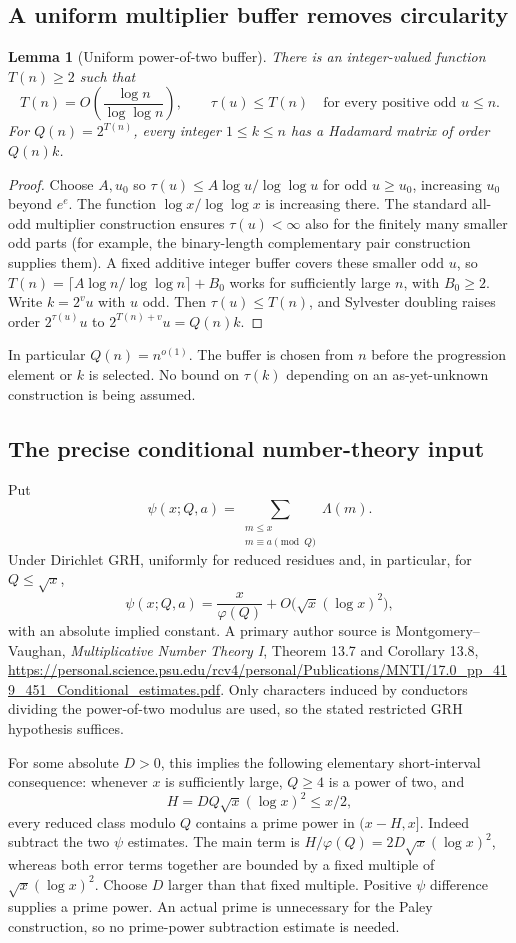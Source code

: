 \documentclass[11pt]{article}
\newtheorem{lemma}[theorem]{Lemma}
\begin{document}
\subsection{A uniform multiplier buffer removes circularity}
\begin{lemma}[Uniform power-of-two buffer]
There is an integer-valued function $T(n)\ge2$ such that
\[
 T(n)=O\!\left(\frac{\log n}{\log\log n}\right),
 \qquad \tau(u)\le T(n)\quad
 \text{for every positive odd }u\le n.
\]
For $Q(n)=2^{T(n)}$, every integer $1\le k\le n$ has a Hadamard
matrix of order $Q(n)k$.
\end{lemma}
\begin{proof}
Choose $A,u_0$ so $\tau(u)\le A\log u/\log\log u$ for odd
$u\ge u_0$, increasing $u_0$ beyond $e^e$. The function
$\log x/\log\log x$ is increasing there. The standard all-odd
multiplier construction ensures $\tau(u)<\infty$ also for the finitely
many smaller odd parts (for example, the binary-length complementary
pair construction supplies them). A fixed additive integer buffer
covers these smaller odd $u$, so
$T(n)=\lceil A\log n/\log\log n\rceil+B_0$ works for sufficiently
large $n$, with $B_0\ge2$. Write $k=2^vu$ with $u$ odd. Then
$\tau(u)\le T(n)$, and Sylvester doubling raises order
$2^{\tau(u)}u$ to $2^{T(n)+v}u=Q(n)k$.
\end{proof}

In particular $Q(n)=n^{o(1)}$. The buffer is chosen from $n$ before
the progression element or $k$ is selected. No bound on $\tau(k)$
depending on an as-yet-unknown construction is being assumed.

\subsection{The precise conditional number-theory input}
Put
\[
 \psi(x;Q,a)=\sum_{\substack{m\le x\\m\equiv a\pmod Q}}\Lambda(m).
\]
Under Dirichlet GRH, uniformly for reduced residues and, in particular,
for $Q\le\sqrt x$,
\[
 \psi(x;Q,a)=\frac{x}{\varphi(Q)}+
 O\bigl(\sqrt x(\log x)^2\bigr),
\]
with an absolute implied constant. A primary author source is
Montgomery--Vaughan, \emph{Multiplicative Number Theory I},
Theorem 13.7 and Corollary 13.8,
\url{https://personal.science.psu.edu/rcv4/personal/Publications/MNTI/17.0_pp_419_451_Conditional_estimates.pdf}.
Only characters induced by conductors dividing the power-of-two
modulus are used, so the stated restricted GRH hypothesis suffices.

For some absolute $D>0$, this implies the following elementary
short-interval consequence: whenever $x$ is sufficiently large,
$Q\ge4$ is a power of two, and
\[
 H=DQ\sqrt x(\log x)^2\le x/2,
\]
every reduced class modulo $Q$ contains a prime power in $(x-H,x]$.
Indeed subtract the two $\psi$ estimates. The main term is
$H/\varphi(Q)=2D\sqrt x(\log x)^2$, whereas both error terms
together are bounded by a fixed multiple of
$\sqrt x(\log x)^2$. Choose $D$ larger than that fixed multiple.
Positive $\psi$ difference supplies a prime power. An actual prime
is unnecessary for the Paley construction, so no prime-power
subtraction estimate is needed.
\end{document}
